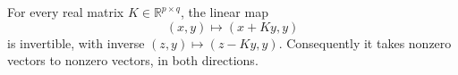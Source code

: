 For every real matrix $K\in\mathbb R^{p\times q}$, the linear map
\[
 (x,y)\longmapsto (x+Ky,y)
\]
is invertible, with inverse $(z,y)\mapsto(z-Ky,y)$. Consequently it takes
nonzero vectors to nonzero vectors, in both directions.